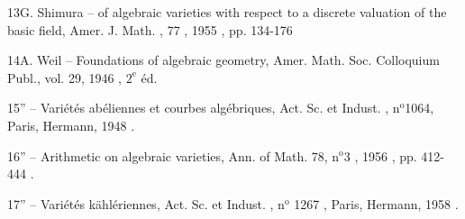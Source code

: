 \handwritten{[}13\handwritten{]}\quad G. Shimura --  of algebraic varieties with respect to a discrete valuation of the basic field, Amer. J. Math. , 77 , 1955 , pp. 134-176

\handwritten{[}14\handwritten{]}\quad A. Weil -- Foundations of algebraic geometry, Amer. Math. Soc. Colloquium Publ., vol. 29, 1946 , $2^{\mathrm e}$ éd.

\handwritten{[}15\handwritten{]}\quad '' -- Variétés abéliennes et courbes algébriques, Act. Sc. et Indust. , n$^{\mathrm o}$1064, Paris, Hermann, 1948 .

\handwritten{[}16\handwritten{]}\quad '' -- Arithmetic on algebraic varieties, Ann. of Math. 78, n$^{\mathrm o}$3 , 1956 , pp. 412-444 .

\handwritten{[}17\handwritten{]}\quad '' -- Variétés kählériennes, Act. Sc. et Indust. , n$^{\mathrm o}$ 1267 , Paris, Hermann, 1958 .
